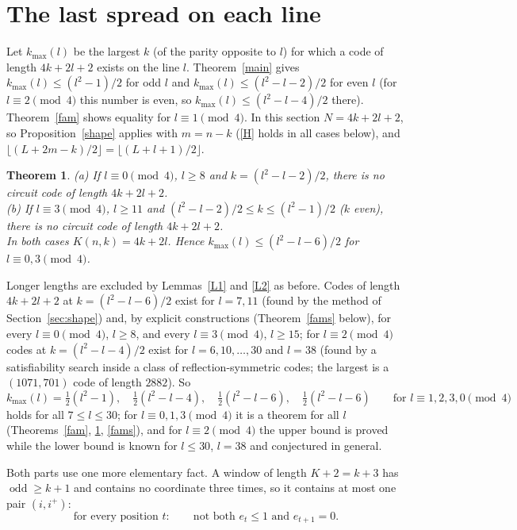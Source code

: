 \documentclass[11pt]{article}
\newtheorem{theorem}{Theorem}
\theoremstyle{remark}
\newcommand{\odd}{\operatorname{odd}}
\begin{document}
\section{The last spread on each line}\label{sec:last}
Let $k_{\max}(l)$ be the largest $k$ (of the parity opposite to $l$) for which a code of length $4k+2l+2$ exists on the line $l$.
Theorem~\ref{main} gives $k_{\max}(l)\le (l^2-1)/2$ for odd $l$ and $k_{\max}(l)\le (l^2-l-2)/2$ for even $l$ (for $l\equiv 2 \pmod 4$
this number is even, so $k_{\max}(l)\le (l^2-l-4)/2$ there). Theorem~\ref{fam} shows equality for $l\equiv 1\pmod 4$.
In this section $N=4k+2l+2$, so Proposition~\ref{shape} applies with $m=n-k$ (\eqref{H} holds in all cases below), and
$\lfloor (L+2m-k)/2\rfloor=\lfloor (L+l+1)/2\rfloor$.
\begin{theorem}\label{last}
{\rm(a)} If $l\equiv 0\pmod 4$, $l\ge 8$ and $k=(l^2-l-2)/2$, there is no circuit code of length $4k+2l+2$.\\
{\rm(b)} If $l\equiv 3\pmod 4$, $l\ge 11$ and $(l^2-l-2)/2\le k\le (l^2-1)/2$ ($k$ even), there is no circuit code of length $4k+2l+2$.\\
In both cases $K(n,k)=4k+2l$. Hence $k_{\max}(l)\le (l^2-l-6)/2$ for $l\equiv 0,3\pmod 4$.
\end{theorem}
Longer lengths are excluded by Lemmas~\ref{L1} and \ref{L2} as before. Codes of length $4k+2l+2$ at $k=(l^2-l-6)/2$ exist for
$l=7,11$ (found by the method of Section~\ref{sec:shape}) and, by explicit constructions (Theorem~\ref{fams} below),
for every $l\equiv 0\pmod 4$, $l\ge 8$, and every $l\equiv 3\pmod 4$, $l\ge 15$; for $l\equiv 2\pmod 4$
codes at $k=(l^2-l-4)/2$ exist for $l=6,10,\dots,30$ and $l=38$ (found by a satisfiability search inside a class of
reflection-symmetric codes; the largest is a $(1071,701)$ code of length $2882$). So
\[ k_{\max}(l)=\tfrac12(l^2-1),\quad \tfrac12(l^2-l-4),\quad \tfrac12(l^2-l-6),\quad \tfrac12(l^2-l-6)\qquad\text{for } l\equiv 1,2,3,0 \pmod 4 \]
holds for all $7\le l\le 30$; for $l\equiv 0,1,3\pmod 4$ it is a theorem for all $l$ (Theorems~\ref{fam}, \ref{last}, \ref{fams}), and for
$l\equiv 2\pmod 4$ the upper bound is proved while the lower bound is known for $l\le 30$, $l=38$ and conjectured in general.

Both parts use one more elementary fact. A window of length $K+2=k+3$ has $\odd\ge k+1$ and contains no coordinate three times, so it
contains at most one pair $(i,i^+)$:
\begin{equation}\label{Y2} \text{for every position } t:\qquad \text{not both } e_t\le 1 \text{ and } e_{t+1}=0. \end{equation}
\end{document}
